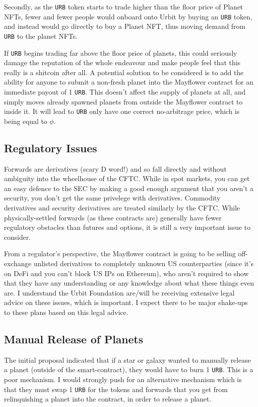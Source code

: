 \documentclass{article}
\begin{document}
	Secondly, as the \texttt{URB} token starts to trade higher than the floor price of Planet NFTs, fewer and fewer people would onboard onto Urbit by buying an \texttt{URB} token, and instead would go directly to buy a Planet NFT, thus moving demand from \texttt{URB} to the planet NFTs.
	
	If \texttt{URB} begins trading far above the floor price of planets, this could seriously damage the reputation of the whole endeavour and make people feel that this really is a shitcoin after all. A potential solution to be considered is to add the ability for anyone to submit a non-fresh planet into the Mayflower contract for an immediate payout of 1 \texttt{URB}. This doesn't affect the supply of planets at all, and simply moves already spawned planets from outside the Mayflower contract to inside it. It will lead to \texttt{URB} only have one correct no-arbitrage price, which is being equal to $\phi$.
	
	\subsection{Regulatory Issues}
	Forwards are derivatives (scary D word!) and so fall directly and without ambiguity into the wheelhouse of the CFTC. While in spot markets, you can get an easy defence to the SEC by making a good enough argument that you aren't a security, you don't get the same privelege with derivatives. Commodity derivatives and security derivatives are treated similarly by the CFTC. While physically-settled forwards (as these contracts are) generally have fewer regulatory obstacles than futures and options, it is still a very important issue to consider.
	
	From a regulator's perspective, the Mayflower contract is going to be selling off-exchange unlisted derivatives to completely unknown US counterparties (since it's on DeFi and you can't block US IPs on Ethereum), who aren't required to show that they have any understanding or any knowledge about what these things even are. I understand the Urbit Foundation are/will be receiving extensive legal advice on these issues, which is important. I expect there to be major shake-ups to these plans based on this legal advice.

	\subsection{Manual Release of Planets}
	The initial proposal indicated that if a star or galaxy wanted to manually release a planet (outside of the smart-contract), they would have to burn 1 \texttt{URB}. This is a poor mechanism. I would strongly push for an alternative mechanism which is that they must swap 1 \texttt{URB} for the tokens and forwards that you get from relinquishing a planet into the contract, in order to release a planet.
	
\end{document}
